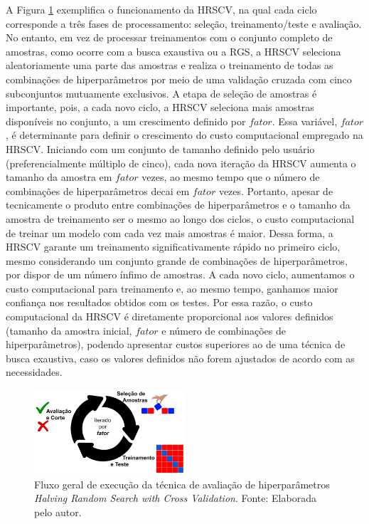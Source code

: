 A Figura \ref{fig:29} exemplifica o funcionamento da HRSCV, na qual cada ciclo corresponde a três fases de processamento: seleção, treinamento/teste e avaliação. No entanto, em vez de processar treinamentos com o conjunto completo de amostras, como ocorre com a busca exaustiva ou a RGS, a HRSCV seleciona aleatoriamente uma parte das amostras e realiza o treinamento de todas as combinações de hiperparâmetros por meio de uma validação cruzada com cinco subconjuntos mutuamente exclusivos. A etapa de seleção de amostras é importante, pois, a cada novo ciclo, a HRSCV seleciona mais amostras disponíveis no conjunto, a um crescimento definido por $fator$. Essa variável, $fator$, é determinante para definir o crescimento do custo computacional empregado na HRSCV. Iniciando com um conjunto de tamanho definido pelo usuário (preferencialmente múltiplo de cinco), cada nova iteração da HRSCV aumenta o tamanho da amostra em $fator$ vezes, ao mesmo tempo que o número de combinações de hiperparâmetros decai em $fator$ vezes. Portanto, apesar de tecnicamente o produto entre combinações de hiperparâmetros e o tamanho da amostra de treinamento ser o mesmo ao longo dos ciclos, o custo computacional de treinar um modelo com cada vez mais amostras é maior. Dessa forma, a HRSCV garante um treinamento significativamente rápido no primeiro ciclo, mesmo considerando um conjunto grande de combinações de hiperparâmetros, por dispor de um número ínfimo de amostras. A cada novo ciclo, aumentamos o custo computacional para treinamento e, ao mesmo tempo, ganhamos maior confiança nos resultados obtidos com os testes. Por essa razão, o custo computacional da HRSCV é diretamente proporcional aos valores definidos (tamanho da amostra inicial, $fator$ e número de combinações de hiperparâmetros), podendo apresentar custos superiores ao de uma técnica de busca exaustiva, caso os valores definidos não forem ajustados de acordo com as necessidades.

\begin{figure}
    \centering
    \includegraphics[width=0.5\textwidth]{FIGURES/fig_29.png}
    \caption{Fluxo geral de execução da técnica de avaliação de hiperparâmetros \textit{Halving Random Search with Cross Validation}. Fonte: Elaborada pelo autor.}
    \label{fig:29}
\end{figure}

